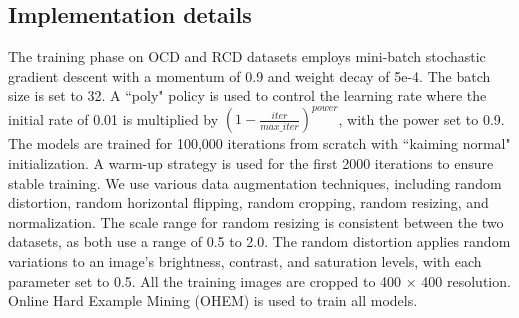 \documentclass[preprint,12pt,authoryear]{elsarticle}
\begin{document}




\subsection{Implementation details}
\label{subsec:implem}

The training phase on OCD and RCD datasets employs mini-batch stochastic gradient descent with a momentum of 0.9 and weight decay of 5e-4. The batch size is set to 32. A ``poly" policy is used to control the learning rate where the initial rate of 0.01 is multiplied by $ (1 - \frac{iter}{max\_iter})^{power}$, with the power set to 0.9. The models are trained for 100,000 iterations from scratch with ``kaiming normal" initialization. A warm-up strategy is used for the first 2000 iterations to ensure stable training. We use various data augmentation techniques, including random distortion, random horizontal flipping, random cropping, random resizing, and normalization. The scale range for random resizing is consistent between the two datasets, as both use a range of 0.5 to 2.0. The random distortion applies random variations to an image's brightness, contrast, and saturation levels, with each parameter set to 0.5. All the training images are cropped to 400 × 400 resolution. Online Hard Example Mining (OHEM) is used to train all models. 
\end{document}
